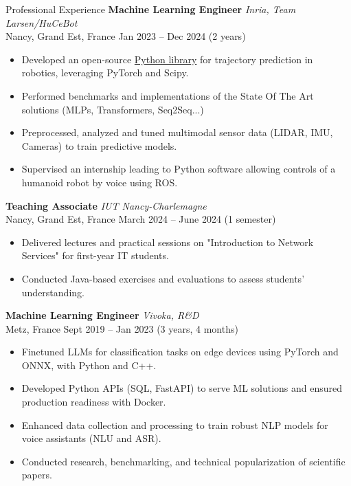 \documentclass{resume} %
\begin{document}
\begin{rSection}{Professional Experience}
\textbf{Machine Learning Engineer} \hfill \textit{Inria, Team Larsen/HuCeBot} \\
Nancy, Grand Est, France \hfill Jan 2023 -- Dec 2024 (2 years)
\begin{itemize}
    \item Developed an open-source \href{https://github.com/hucebot/prescyent}{Python library} for trajectory prediction in robotics, leveraging PyTorch and Scipy.
    \item Performed benchmarks and implementations of the State Of The Art solutions (MLPs, Transformers, Seq2Seq...)
    \item Preprocessed, analyzed and tuned multimodal sensor data (LIDAR, IMU, Cameras) to train predictive models.
    \item Supervised an internship leading to Python software allowing controls of a humanoid robot by voice using ROS.
\end{itemize}

\vspace{0.1cm}

\textbf{Teaching Associate} \hfill \textit{IUT Nancy-Charlemagne} \\
Nancy, Grand Est, France \hfill March 2024 -- June 2024  (1 semester)
\begin{itemize}
    \item Delivered lectures and practical sessions on "Introduction to Network Services" for first-year IT students.
    \item Conducted Java-based exercises and evaluations to assess students' understanding.
\end{itemize}

\vspace{0.1cm}

\textbf{Machine Learning Engineer} \hfill \textit{Vivoka, R\&D} \\
Metz, France \hfill Sept 2019 -- Jan 2023 (3 years, 4 months)
\begin{itemize}
    \item Finetuned LLMs for classification tasks on edge devices using PyTorch and ONNX, with Python and C++.
    \item Developed Python APIs (SQL, FastAPI) to serve ML solutions and ensured production readiness with Docker.
    \item Enhanced data collection and processing to train robust NLP models for voice assistants (NLU and ASR).
    \item Conducted research, benchmarking, and technical popularization of scientific papers.
\end{itemize}


\end{rSection}
\end{document}
